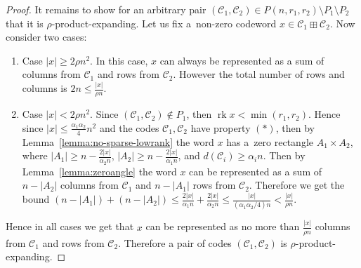 \documentclass[11pt]{article}
\let\le\leqslant
\let\ge\geqslant
\theoremstyle{plain}
\theoremstyle{definition}
\theoremstyle{remark}
\newcommand{\cC}{\mathcal{C}}
\DeclareMathOperator{\rk}{rk}
\begin{document}
\begin{proof}
    It remains to show for an arbitrary pair $(\cC_1,\cC_2)\in P(n,r_1,r_2)\setminus P_1\setminus P_2$ that it is $\rho$-product-expanding. Let us fix a~non-zero codeword $x\in \cC_1\boxplus \cC_2$. Now consider two cases:
    \begin{enumerate}
        \item Case $|x|\ge 2\rho n^2$. In this case, $x$ can always be represented as a sum of columns from $\cC_1$ and rows from $\cC_2$. However the total number of rows and columns is $2n\le\frac{|x|}{\rho n}$.
        \item Case $|x|< 2\rho n^2$. Since $(\cC_1,\cC_2)\not\in P_1$, then $\rk x<\min(r_1,r_2)$. Hence since  $|x|\le \frac{\alpha_1\alpha_2}{4}n^2$ and the codes $\cC_1,\cC_2$ have property $(*)$, then by Lemma~\ref{lemma:no-sparse-lowrank} the word $x$ has a~zero rectangle $A_1\times A_2$, where $|A_1|\ge n-\frac{2|x|}{\alpha_2 n}$, $|A_2|\ge n-\frac{2|x|}{\alpha_1 n}$, and $d(\cC_i)\ge \alpha_i n$. Then by Lemma~\ref{lemma:zeroangle} the word $x$ can be represented as a sum of  $n-|A_2|$ columns from  $\cC_1$ and $n-|A_1|$ rows from $\cC_2$.
        Therefore we get the bound $(n-|A_1|)+(n-|A_2|)\le \frac{2|x|}{\alpha_1 n}+\frac{2|x|}{\alpha_2 n}\le \frac{|x|}{(\alpha_1\alpha_2/4)n}<\frac{|x|}{\rho n}$.
    \end{enumerate}
    Hence in all cases we get that $x$ can be represented as no more than $\frac{|x|}{\rho n}$ columns from  $\cC_1$ and rows from $\cC_2$. Therefore a pair of codes $(\cC_1,\cC_2)$ is $\rho$-product-expanding.
\end{proof}
\end{document}
